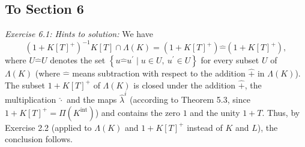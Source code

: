 \documentclass[numbers=enddot,12pt,final,onecolumn,notitlepage]{scrartcl}%
\begin{document}
\subsection{To Section 6}

\textit{Exercise 6.1: Hints to solution:} We have%
\[
\left(  1+K\left[  T\right]  ^{+}\right)  ^{-1}K\left[  T\right]  \cap
\Lambda\left(  K\right)  =\left(  1+K\left[  T\right]  ^{+}\right)
\widehat{-}\left(  1+K\left[  T\right]  ^{+}\right)  ,
\]
where $U\widehat{-}U$ denotes the set $\left\{  u\widehat{-}u^{\prime}\mid
u\in U,\ u^{\prime}\in U\right\}  $ for every subset $U$ of $\Lambda\left(
K\right)  $ (where $\widehat{-}$ means subtraction with respect to the
addition $\widehat{+}$ in $\Lambda\left(  K\right)  $). The subset $1+K\left[
T\right]  ^{+}$ of $\Lambda\left(  K\right)  $ is closed under the addition
$\widehat{+}$, the multiplication $\widehat{\cdot}$ and the maps
$\widehat{\lambda}^{i}$ (according to Theorem 5.3, since $1+K\left[  T\right]
^{+}=\Pi\left(  K^{\operatorname*{int}}\right)  $) and contains the zero $1$
and the unity $1+T$. Thus, by Exercise 2.2 (applied to $\Lambda\left(
K\right)  $ and $1+K\left[  T\right]  ^{+}$ instead of $K$ and $L$), the
conclusion follows.
\end{document}
